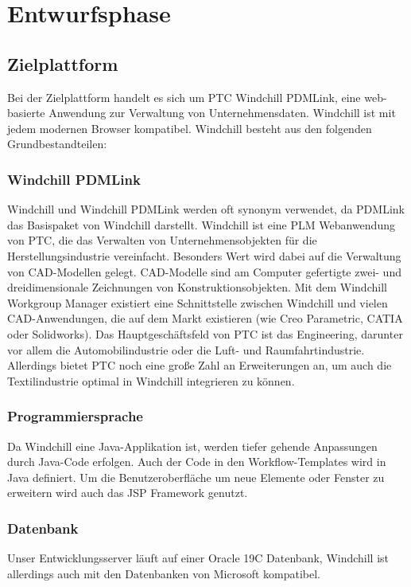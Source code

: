 \section{Entwurfsphase} 
\label{sec:Entwurfsphase}

\subsection{Zielplattform}
\label{sec:Zielplattform}

Bei der Zielplattform handelt es sich um PTC Windchill PDMLink, eine web-basierte Anwendung zur Verwaltung von Unternehmensdaten.
Windchill ist mit jedem modernen Browser kompatibel.
Windchill besteht aus den folgenden Grundbestandteilen:

\subsubsection{Windchill PDMLink}
Windchill und Windchill PDMLink werden oft synonym verwendet, da PDMLink das Basispaket von Windchill darstellt.
Windchill ist eine \ac{PLM} Webanwendung von PTC, die das Verwalten von Unternehmensobjekten für die Herstellungsindustrie vereinfacht.
Besonders Wert wird dabei auf die Verwaltung von CAD-Modellen gelegt.
CAD-Modelle sind am Computer gefertigte zwei- und dreidimensionale Zeichnungen von Konstruktionsobjekten.
Mit dem Windchill Workgroup Manager existiert eine Schnittstelle zwischen Windchill und vielen CAD-Anwendungen, die auf dem Markt existieren (wie \zB Creo Parametric, CATIA oder Solidworks).
Das Hauptgeschäftsfeld von PTC ist das Engineering, darunter vor allem die Automobilindustrie oder die Luft- und Raumfahrtindustrie.
Allerdings bietet PTC noch eine große Zahl an Erweiterungen an, um \zB auch die Textilindustrie optimal in Windchill integrieren zu können.

\subsubsection{Programmiersprache}
Da Windchill eine Java-Applikation ist, werden tiefer gehende Anpassungen durch Java-Code erfolgen.
Auch der Code in den Workflow-Templates wird in Java definiert.
Um die Benutzeroberfläche um neue Elemente oder Fenster zu erweitern wird auch das JSP Framework genutzt.

\subsubsection{Datenbank}
Unser Entwicklungsserver läuft auf einer Oracle 19C Datenbank, Windchill ist allerdings auch mit den Datenbanken von Microsoft kompatibel.

